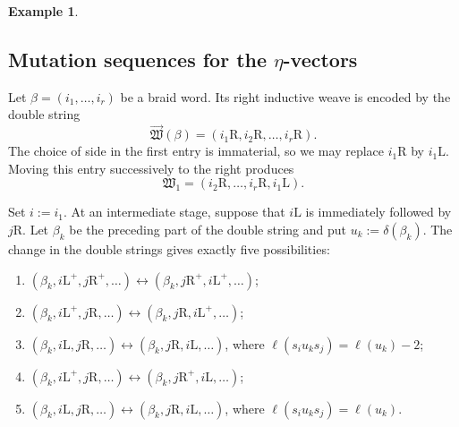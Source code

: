 \documentclass[12pt, reqno]{amsart}
\theoremstyle{plain}
\theoremstyle{definition}
\newtheorem{example}[theorem]{Example}
\numberwithin{equation}{section}
\begin{document}
\begin{example}
\end{example}

\subsection{Mutation sequences for the
\texorpdfstring{\(\eta\)}{eta}-vectors}

Let \(\beta=(i_1,\ldots,i_r)\) be a braid word. Its right inductive
weave is encoded by the double string
\begin{equation}\label{eq:right-inductive-double-string}
    \overrightarrow{\mathfrak W}(\beta)
    =(i_1\mathrm R,i_2\mathrm R,\ldots,i_r\mathrm R).
\end{equation}
The choice of side in the first entry is immaterial, so we may replace
\(i_1\mathrm R\) by \(i_1\mathrm L\). Moving this entry successively
to the right produces
\begin{equation}\label{eq:shifted-right-inductive-weave}
    \mathfrak W_1
    =(i_2\mathrm R,\ldots,i_r\mathrm R,i_1\mathrm L).
\end{equation}

Set \(i:=i_1\). At an intermediate stage, suppose that
\(i\mathrm L\) is immediately followed by \(j\mathrm R\). Let
\(\beta_k\) be the preceding part of the double string and put
\(u_k:=\delta(\beta_k)\). The change in the double strings gives
exactly five possibilities:
\begin{enumerate}[label=\textup{(\arabic*)}]
    \item \((\beta_k,i\mathrm L^+,j\mathrm R^+,\ldots)
    \longleftrightarrow
    (\beta_k,j\mathrm R^+,i\mathrm L^+,\ldots)\);

    \item \((\beta_k,i\mathrm L^+,j\mathrm R,\ldots)
    \longleftrightarrow
    (\beta_k,j\mathrm R,i\mathrm L^+,\ldots)\);

    \item \((\beta_k,i\mathrm L,j\mathrm R,\ldots)
    \longleftrightarrow
    (\beta_k,j\mathrm R,i\mathrm L,\ldots)\), where
    \(\ell(s_i u_k s_j)=\ell(u_k)-2\);

    \item \((\beta_k,i\mathrm L^+,j\mathrm R,\ldots)
    \longleftrightarrow
    (\beta_k,j\mathrm R^+,i\mathrm L,\ldots)\);

    \item \((\beta_k,i\mathrm L,j\mathrm R,\ldots)
    \longleftrightarrow
    (\beta_k,j\mathrm R,i\mathrm L,\ldots)\), where
    \(\ell(s_i u_k s_j)=\ell(u_k)\).
\end{enumerate}
\end{document}
